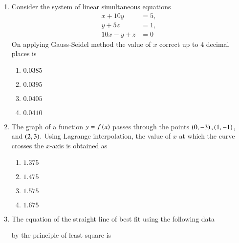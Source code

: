 \documentclass[journal]{IEEEtran}
\begin{document}
\begin{enumerate}
{If the two eigen values of the matrix $M=\myvec{2&6&0\\1&p&0\\0&0&3}$ are $-1$ and $4$, then the value of $p$ is 
\begin{multicols}{4}
\begin{enumerate}
\item $4$
\item $2$
\item $1$
\item $-1$
\end{enumerate}
\end{multicols}
}
\item{
Consider the system of linear simultaneous equations
\begin{align}
x+10y &= 5, \\
y+5z &= 1, \\
10x-y+z &= 0
\end{align}
On applying Gauss-Seidel method the value of $x$ correct up to $4$ decimal places is
\begin{multicols}{4}
\begin{enumerate}
\item $0.0385$
\item $0.0395$
\item $0.0405$
\item $0.0410$
\end{enumerate}
\end{multicols}
}
\item{
The graph of a function $y=f\left(x\right)$ passes through the points $\left(0,-3\right),\left(1,-1\right)$, and $\left(2,3\right)$. Using Lagrange interpolation, the value of $x$ at which the curve crosses the $x$-axis is obtained as
\begin{multicols}{4}
\begin{enumerate}
\item $1.375$
\item $1.475$
\item $1.575$
\item $1.675$
\end{enumerate}
\end{multicols}
}
\item{
The equation of the straight line of best fit using the following data 
\begin{table}[h!]   
  \centering
  
\end{table}
by the principle of least square is
\begin{multicols}{4}
\begin{enumerate}

\end{enumerate}
\end{multicols}}
\end{enumerate}
\end{document}
